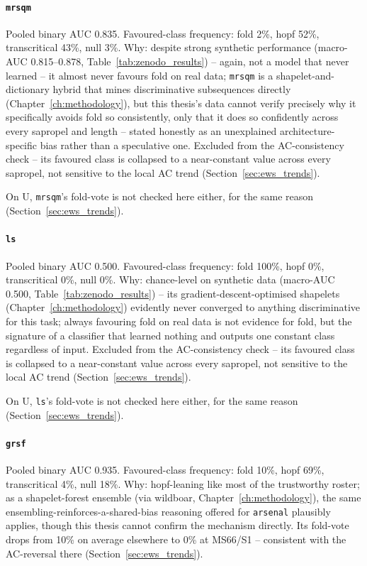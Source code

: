 \paragraph{\texttt{mrsqm}} Pooled binary AUC 0.835. Favoured-class frequency: fold 2\%, hopf 52\%, transcritical 43\%, null 3\%. Why: despite strong synthetic performance (macro-AUC 0.815--0.878, Table~\ref{tab:zenodo_results}) -- again, not a model that never learned -- it almost never favours fold on real data; \texttt{mrsqm} is a shapelet-and-dictionary hybrid that mines discriminative subsequences directly (Chapter~\ref{ch:methodology}), but this thesis's data cannot verify precisely why it specifically avoids fold so consistently, only that it does so confidently across every sapropel and length -- stated honestly as an unexplained architecture-specific bias rather than a speculative one. Excluded from the AC-consistency check -- its favoured class is collapsed to a near-constant value across every sapropel, not sensitive to the local AC trend (Section~\ref{sec:ews_trends}).

On U, \texttt{mrsqm}'s fold-vote is not checked here either, for the same reason (Section~\ref{sec:ews_trends}).

\paragraph{\texttt{ls}} Pooled binary AUC 0.500. Favoured-class frequency: fold 100\%, hopf 0\%, transcritical 0\%, null 0\%. Why: chance-level on synthetic data (macro-AUC 0.500, Table~\ref{tab:zenodo_results}) -- its gradient-descent-optimised shapelets (Chapter~\ref{ch:methodology}) evidently never converged to anything discriminative for this task; always favouring fold on real data is not evidence for fold, but the signature of a classifier that learned nothing and outputs one constant class regardless of input. Excluded from the AC-consistency check -- its favoured class is collapsed to a near-constant value across every sapropel, not sensitive to the local AC trend (Section~\ref{sec:ews_trends}).

On U, \texttt{ls}'s fold-vote is not checked here either, for the same reason (Section~\ref{sec:ews_trends}).

\paragraph{\texttt{grsf}} Pooled binary AUC 0.935. Favoured-class frequency: fold 10\%, hopf 69\%, transcritical 4\%, null 18\%. Why: hopf-leaning like most of the trustworthy roster; as a shapelet-forest ensemble (via wildboar, Chapter~\ref{ch:methodology}), the same ensembling-reinforces-a-shared-bias reasoning offered for \texttt{arsenal} plausibly applies, though this thesis cannot confirm the mechanism directly. Its fold-vote drops from 10\% on average elsewhere to 0\% at MS66/S1 -- consistent with the AC-reversal there (Section~\ref{sec:ews_trends}).

